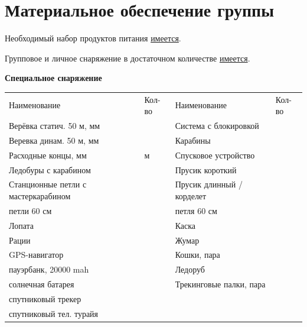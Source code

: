 \documentclass[a5paper, 12pt, twoside]{article}
\begin{document}
\newpage %
    \section{Материальное обеспечение группы}\label{s:weight}
        \footnotesize
        Необходимый набор продуктов питания \uline{имеется}.

        Групповое и личное снаряжение в достаточном количестве \uline{имеется}.

        {\centering\textbf{Специальное снаряжение}\par}
        \vspace{-0.3cm}

        \renewcommand{\arraystretch}{1.1}
        {\footnotesize%
        \begin{longtable}{%
            |>{\centering\arraybackslash} m{4.8cm}%
            |>{\centering\arraybackslash} m{1.3cm}%
            |>{\centering\arraybackslash} m{4.8cm}%
            |>{\centering\arraybackslash} m{1.3cm}|}
            \hline\rowcolor{Gray}
            \multicolumn{2}{|c|}{Групповое}                     &   \multicolumn{2}{c|}{Личное}             \\ \hline\rowcolor{Gray}
            Наименование                            &   Кол-во  &   Наименование                &   Кол-во  \\ \hline
            Верёвка статич. 50 м, \diameter 9 мм & 3 & Система с блокировкой & 1\\ \hline Веревка динам. 50 м, \diameter 9 мм & 1 & Карабины & 6\\ \hline Расходные концы, \diameter 6 мм & 20 м & Спусковое устройство & 1\\ \hline Ледобуры с карабином & 18 & Прусик короткий & 1\\ \hline Станционные петли с мастеркарабином & 5 & Прусик длинный / корделет & 1\\ \hline петли 60 см & 4 & петля 60 см & 1\\ \hline Лопата & 1 & Каска & 1\\ \hline Рации & 4 & Жумар & 1\\ \hline GPS-навигатор & 2 & Кошки, пара & 1\\ \hline пауэрбанк, 20000 mah & 1 & Ледоруб & 1\\ \hline солнечная батарея & 1 & Трекинговые палки, пара & 1\\ \hline спутниковый трекер & 1 &  & \\ \hline спутниковый тел. турайя & 1 &  & \\ \hline 
        \end{longtable}}
        \vspace{-0.3cm}
\end{document}
